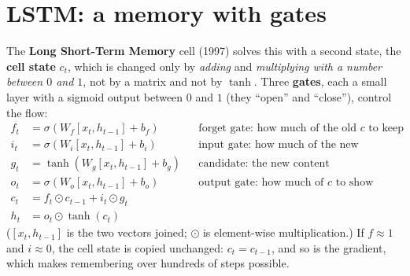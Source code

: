 \section*{LSTM: a memory with gates}
The \textbf{Long Short-Term Memory} cell (1997) solves this with a second state, the \textbf{cell state} $c_t$, which is changed only by \emph{adding} and \emph{multiplying with a number between $0$ and $1$}, not by a matrix and not by $\tanh$. Three \textbf{gates}, each a small layer with a sigmoid output between $0$ and $1$ (they ``open'' and ``close''), control the flow:
\begin{align*}
f_t&=\sigma(W_f[x_t,h_{t-1}]+b_f) &&\text{forget gate: how much of the old $c$ to keep}\\
i_t&=\sigma(W_i[x_t,h_{t-1}]+b_i) &&\text{input gate: how much of the new candidate to write}\\
g_t&=\tanh(W_g[x_t,h_{t-1}]+b_g) &&\text{candidate: the new content}\\
o_t&=\sigma(W_o[x_t,h_{t-1}]+b_o) &&\text{output gate: how much of $c$ to show}\\
c_t&=f_t\odot c_{t-1}+i_t\odot g_t\\
h_t&=o_t\odot\tanh(c_t)
\end{align*}
($[x_t,h_{t-1}]$ is the two vectors joined; $\odot$ is element-wise multiplication.) If $f\approx1$ and $i\approx0$, the cell state is copied unchanged: $c_t=c_{t-1}$, and so is the gradient, which makes remembering over hundreds of steps possible.
